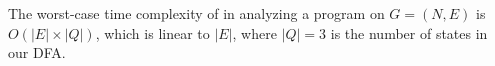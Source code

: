 \begin{comment}
\begin{theorem} \label{theorem:precisionpreserving}
Let $\kcs{k}_{pre}$ be the version of \kcs{k}, which analyzes variables/objects in a program that satisfy \Cref{eqn:cflcsconditionFinal} context-sensitively while others context-insensitively. Then $\kcs{k}_{pre}$
has exactly the same precision as \kcs{k}:  $\cipointstonoarg_{\kcs{k}_{pre}}(v) = \cipointstonoarg_{\kcs{k}}(v)$ for every $v$ in the program.
\end{theorem}
\end{comment}


The worst-case time complexity of \tool in analyzing a program on   $G=(N,E)$
is $O(|E|\times |Q|)$, which is linear to $|E|$, where $|Q|=3$ is  the number of states in our DFA.
